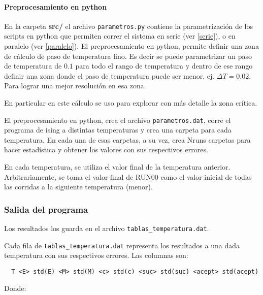 \paragraph{Preprocesamiento en python}

En la carpeta \textbf{src/} el archivo \texttt{parametros.py} contiene la 
parametrizaci\'on de los scripts en python que permiten correr el sistema en 
serie (ver \eqref{serie}), 
o en paralelo (ver \eqref{paralelo}).
El preprocesamiento en python, permite definir una zona de c\'alculo de paso
de temperatura fino. Es decir se puede parametrizar un paso de temperatura de
$0.1$ para todo el rango de temperatura y dentro de ese rango definir una zona
donde el paso de temperatura puede ser menor, ej. $\Delta T = 0.02$. Para 
lograr una mejor resoluci\'on
en esa zona.

En particular en este c\'alculo se uso para explorar con m\'as detalle la zona
cr\'itica.

El preprocesamiento en python, crea el archivo \texttt{parametros.dat}, 
 corre el programa de ising a distintas temperaturas y crea una carpeta para 
 cada temperatura. En cada una de esas carpetas, a su vez, crea Nruns carpetas 
 para hacer estadística y obtener los valores con sus respectivos errores.
 
  En cada temperatura, se utiliza el valor final de la temperatura anterior.
  Arbitrariamente, se toma el valor final de RUN00 como el valor inicial de
  todas las corridas a la siguiente temperatura (menor).
 

\subsubsection{Salida del programa}

Los resultados los guarda en el archivo \texttt{tablas\_temperatura.dat}.

Cada fila de \texttt{tablas\_temperatura.dat} representa los resultados a una 
dada temperatura con sus respectivos errores. Las columnas son:

\begin{verbatim}
  T <E> std(E) <M> std(M) <c> std(c) <suc> std(suc) <acept> std(acept)
\end{verbatim}

Donde:

